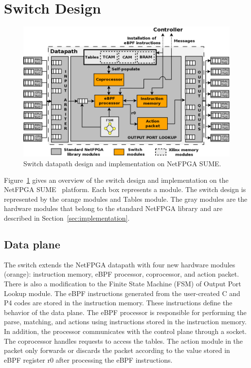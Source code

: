 \section{Switch Design}
\label{sec:design}

\begin{figure}[htbp]
\centering
\includegraphics[width=.8\textwidth]{figures/06_fig01.png}
\caption{Switch datapath design and implementation on NetFPGA SUME.}
\label{fig:06_fig01}
\end{figure}

Figure~\ref{fig:06_fig01} gives an overview of the switch design and implementation on the NetFPGA SUME~\cite{SUME2014} platform. 
Each box represents a module.
The switch design is represented by the orange modules and Tables module.
The gray modules are the hardware modules that belong to the standard NetFPGA library and are described in Section~\ref{sec:implementation}.


\subsection{Data plane}

The switch extends the NetFPGA datapath with four new hardware modules (orange): instruction memory, eBPF processor, coprocessor, and action packet. There is also a modification to the Finite State Machine (FSM) of Output Port Lookup module. The eBPF instructions generated from the user-created C and P4 codes are stored in the instruction memory. These instructions define the behavior of the data plane. The eBPF processor is responsible for performing the parse, matching, and actions using instructions stored in the instruction memory. In addition, the processor communicates with the control plane through a socket. The coprocessor handles requests to access the tables. The action module in the packet only forwards or discards the packet according to the value stored in eBPF register r0 after processing the eBPF instructions. %

